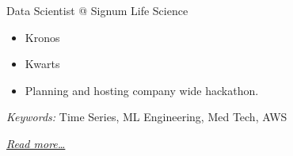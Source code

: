 \large{Data Scientist @ Signum Life Science}

\normalsize
\begin{itemize}
    \item Kronos
    \item Kwarts
    \item Planning and hosting company wide hackathon.
\end{itemize}

\small{\textit{Keywords:} Time Series, ML Engineering, Med Tech, AWS}

\hfill{\small{\textit{\hyperref[sec:signum]{Read more…}}}}

